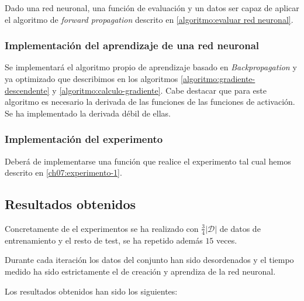 Dado una red neuronal, una función de evaluación y un datos ser capaz de aplicar el algoritmo de \textit{forward propagation} descrito en \ref{algoritmo:evaluar red neuronal}.

\subsubsection{Implementación del aprendizaje de una red neuronal} 
Se implementará el algoritmo propio de aprendizaje basado en \textit{Backpropagation} y ya optimizado 
que describimos en los algoritmos \ref{algoritmo:gradiente-descendente} y \ref{algoritmo:calculo-gradiente}.
Cabe destacar que para este algoritmo es necesario la derivada de las funciones de las funciones de activación. Se ha implementado la derivada débil de ellas. 

\subsubsection{Implementación del experimento} 
Deberá de implementarse una función que realice el 
experimento tal cual hemos descrito en \ref{ch07:experimento-1}.

\subsection{Resultados obtenidos}

Concretamente de el experimentos se ha realizado con $\frac{3}{4}|\mathcal{D}|$ de datos de entrenamiento 
y el resto de test, se ha repetido además $15$ veces. 

Durante cada iteración los datos del conjunto han sido desordenados y el tiempo medido ha sido estrictamente el de creación y aprendiza de la red neuronal. 

Los resultados obtenidos han sido los siguientes: 

